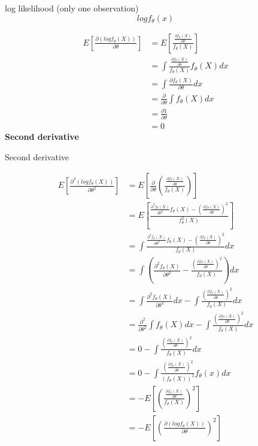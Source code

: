 \documentclass[]{book}
\begin{document}
log likelihood (only one observation)
\[log f_{\theta}(x)\]

\[\begin{aligned} E[\frac{\partial (logf_{\theta}(X))}{\partial \theta} ] &=E[\frac{\frac{\partial f_{\theta}(X)}{\partial \theta}}{f_{\theta}(X)}] \\ &= \int \frac{\frac{\partial f_{\theta}(X)}{\partial \theta}}{f_{\theta}(X)} f_{\theta}(X) dx  \\ &= \int \frac{\partial f_{\theta}(X)}{\partial \theta} dx \\ &= \frac{\partial}{\partial \theta} \int f_{\theta}(X)dx \\ &= \frac{\partial 1}{\partial \theta} \\ &=0  \end{aligned}\]
\textbf{Second derivative}

Second derivative

\[\begin{aligned} E[\frac{\partial^2 (logf_{\theta}(X))}{\partial \theta^2} ] &=E[ \frac{\partial}{\partial \theta}(\frac{\frac{\partial f_{\theta}(X)}{\partial \theta}}{f_{\theta}(X)})] \\  
&=E[\frac{\frac{\partial^2 f_{\theta}(X)}{\partial \theta^2}f_{\theta}(X)-(\frac{\partial f_{\theta}(X)}{\partial \theta})^2}{f^2_{\theta}(X)}] \\ &= \int \frac{\frac{\partial^2 f_{\theta}(X)}{\partial \theta^2}f_{\theta}(X)-(\frac{\partial f_{\theta}(X)}{\partial \theta})^2}{f_{\theta}(X)}dx \\ &=\int (\frac{\partial^2 f_{\theta}(X)}{\partial \theta^2} - \frac{(\frac{\partial f_{\theta}(X)}{\partial \theta})^2}{f_{\theta}(X)})dx  \\ 
&= \int \frac{\partial^2 f_{\theta}(X)}{\partial \theta^2} dx -\int \frac{(\frac{\partial f_{\theta}(X)}{\partial \theta})^2}{f_{\theta}(X)}dx \\ 
&=\frac{\partial^2}{\partial \theta^2}\int f_{\theta}(X) dx -\int \frac{(\frac{\partial f_{\theta}(X)}{\partial \theta})^2}{f_{\theta}(X)}dx \\ 
&=0-\int \frac{(\frac{\partial f_{\theta}(X)}{\partial \theta})^2}{f_{\theta}(X)}dx \\
&=0-\int \frac{(\frac{\partial f_{\theta}(X)}{\partial \theta})^2}{(f_{\theta}(X))^2}f_{\theta}(x)dx \\ &= - E[(\frac{\frac{\partial f_{\theta}(X)}{\partial \theta}}{f_{\theta}(X)})^2]\\ &= -E[(\frac{\partial (logf_{\theta}(X))}{\partial \theta})^2] \end{aligned}\]
\end{document}
